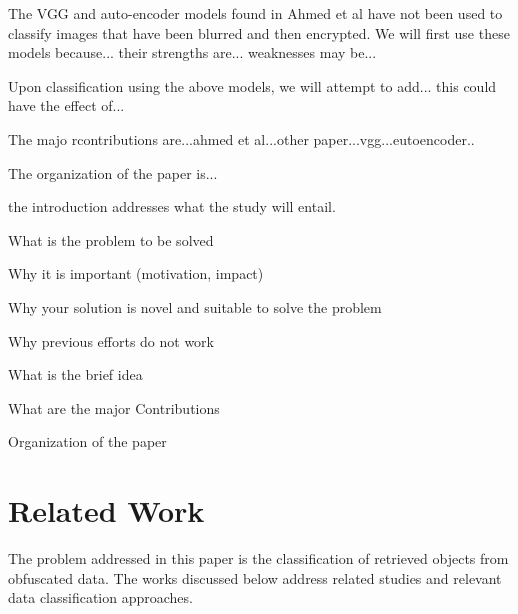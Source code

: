 \documentclass[12pt, titlepage]{article}
\begin{document}
The VGG and auto-encoder models found in Ahmed et al have not been used to classify images that have been blurred and then encrypted. We will first use these models because... their strengths are... weaknesses may be...

Upon classification using the above models, we will attempt to add... this could have the effect of...

The majo rcontributions are...ahmed et al...other paper...vgg...eutoencoder..

The organization of the paper is...



the introduction addresses what the study will entail. 

What is the problem to be solved

Why it is important (motivation, impact)

Why your solution is novel and suitable 
to solve the problem

Why previous efforts do not work

What is the brief idea

What are the major Contributions

Organization of the paper


\section{Related Work}
The problem addressed in this paper is the classification of retrieved objects from obfuscated data. The works discussed below address related studies and relevant data classification approaches.
\end{document}

